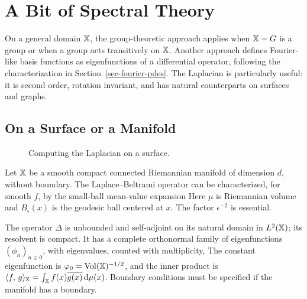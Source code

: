 %

\section{A Bit of Spectral Theory}

On a general domain $\mathbb{X}$, the group-theoretic approach applies when $\mathbb{X}=G$ is a group or when a group acts transitively on $\mathbb{X}$. Another approach defines Fourier-like basis functions as eigenfunctions of a differential operator, following the characterization in Section~\ref{sec-fourier-pdes}. The Laplacian is particularly useful: it is second order, rotation invariant, and has natural counterparts on surfaces and graphs.


\subsection{On a Surface or a Manifold}

\begin{figure}[tbp]
\centering
{}
\caption{Computing the Laplacian on a surface.}
\label{fig-review-fourier-laplacian-surface}
\end{figure}
Let $\mathbb{X}$ be a smooth compact connected Riemannian manifold of dimension $d$, without boundary. The Laplace--Beltrami operator can be characterized, for smooth $f$, by the small-ball mean-value expansion
Here $\mu$ is Riemannian volume and $B_\epsilon(x)$ is the geodesic ball centered at $x$. The factor $\epsilon^{-2}$ is essential.

The operator $\Delta$ is unbounded and self-adjoint on its natural domain in $L^2(\mathbb{X})$; its resolvent is compact. It has a complete orthonormal family of eigenfunctions $(\phi_n)_{n\geq0}$, with eigenvalues, counted with multiplicity,
The constant eigenfunction is $\varphi_0=\mathrm{Vol}(\mathbb{X})^{-1/2}$, and the inner product is $\langle f,\,g\rangle_{\mathbb{X}}=\int_{\mathbb{X}} f(x)\overline{g(x)}\,\mathrm{d}\mu(x)$. Boundary conditions must be specified if the manifold has a boundary.

